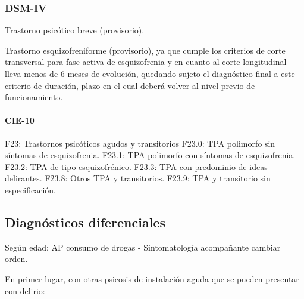 \subsubsection*{DSM-IV}

Trastorno psicótico breve (provisorio).

Trastorno esquizofreniforme (provisorio), ya que cumple los criterios de corte transversal para fase activa de esquizofrenia y en cuanto al corte longitudinal lleva menos de 6 meses de evolución, quedando sujeto el diagnóstico final a este criterio de duración, plazo en el cual deberá volver al nivel previo de funcionamiento.

\paragraph{CIE-10}

F23: Trastornos psicóticos agudos y transitorios
F23.0: TPA polimorfo sin síntomas de esquizofrenia.
F23.1: TPA polimorfo con síntomas de esquizofrenia.
F23.2: TPA de tipo esquizofrénico.
F23.3: TPA con predominio de ideas delirantes.
F23.8: Otros TPA y transitorios.
F23.9: TPA y transitorio sin especificación.
\subsection*{Diagnósticos diferenciales}
Según edad: AP consumo de drogas - Sintomatología acompañante cambiar orden.

En primer lugar, con otras psicosis de instalación aguda que se pueden presentar con delirio:

